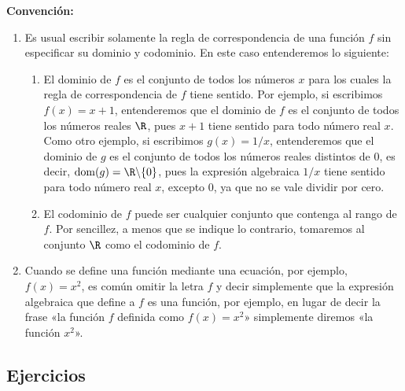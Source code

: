 \documentclass[12pt,a4paper]{book}
\DeclareMathOperator{\dom}{dom}
\begin{document}
    \textbf{Convención:}
    \begin{enumerate}[label=\arabic*.]
        \item Es usual escribir solamente la regla de correspondencia de una función
        $f$ sin especificar su dominio y codominio. En este caso entenderemos lo
        siguiente:
        \begin{enumerate}
            \item El dominio de $f$ es el conjunto de todos los números $x$ para los cuales la
            regla de correspondencia de $f$ tiene sentido. Por ejemplo, si escribimos
            $f(x)=x+1$, entenderemos que el dominio de $f$ es el conjunto de todos
            los números reales $\R$, pues $x+1$ tiene sentido para todo número real
            $x$. Como otro ejemplo, si escribimos $g(x)=1/x$, entenderemos que el
            dominio de $g$ es el conjunto de todos los números reales distintos de
            $0$, es decir, $\dom(g)=\R\backslash\{0\}$, pues la expresión algebraica $1/x$ tiene
            sentido para todo número real $x$, excepto $0$, ya que no se vale dividir
            por cero.
            \item El codominio de $f$ puede ser cualquier conjunto que contenga al rango
            de $f$. Por sencillez, a menos que se indique lo contrario, tomaremos al
            conjunto $\R$ como el codominio de $f$.
        \end{enumerate}
        \item Cuando se define una función mediante una ecuación, por ejemplo, $f(x)=
        x^{2}$, es común omitir la letra $f$ y decir simplemente que la expresión algebraica
        que define a $f$ es una función, por ejemplo, en lugar de decir la frase
        «la función $f$ definida como $f(x)=x^{2}$» simplemente diremos «la función
        $x^{2}$».
    \end{enumerate}

    \par{}\subsection*{Ejercicios}
\end{document}
